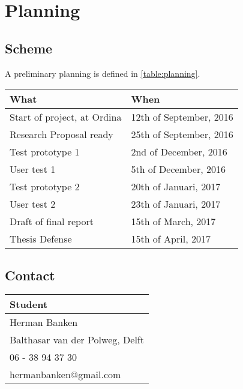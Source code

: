 \section{Planning}

\subsection{Scheme}%
A preliminary planning is defined in \autoref{table:planning}.

\begin{table}[h]
    \label{table:planning}
    \centering
    \begin{tabular}{@{}ll@{}}
        \textbf{What}               & \textbf{When}           \\ 
        \hline
        Start of project, at Ordina & 12th of September, 2016 \\ 
        Research Proposal ready     & 25th of September, 2016 \\ 
        \hline
        Test prototype 1            & 2nd of December, 2016   \\ 
        User test 1                 & 5th of December, 2016   \\ 
        \hline
        Test prototype 2            & 20th of Januari, 2017   \\ 
        User test 2                 & 23th of Januari, 2017   \\ 
        \hline
        Draft of final report       & 15th of March, 2017     \\ 
        \hline
        Thesis Defense              & 15th of April, 2017     \\ 
    \end{tabular}
\end{table}

\subsection{Contact}

\begin{table}[h]
    \centering
    \begin{tabular}{@{}l@{}}
        \textbf{Student}                \\ 
        \hline
        Herman Banken                   \\ 
        Balthasar van der Polweg, Delft \\ 
        06 - 38 94 37 30                \\ 
        hermanbanken@gmail.com          \\ 
    \end{tabular}
\end{table}

